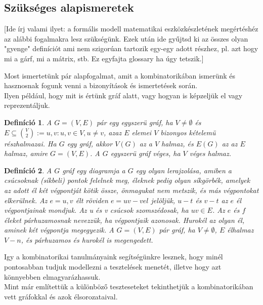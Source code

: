 \documentclass[12pt]{article}
\newtheorem{defin}{Definíció}[section]
\begin{document}
\subsection{Szükséges alapismeretek}
[Ide írj valami ilyet: a formális modell matematikai eszközkészletének megértéshéz az alábbi fogalmakra lesz szükségünk. Ezek után ide gyűjtsd ki az összes olyan "gyenge" definíciót ami nem szigorúan tartozik egy-egy adott részhez, pl. azt hogy mi a gárf, mi a mátrix, stb. Ez egyfajta glossary ha úgy tetszik.]



Most ismertetünk pár alapfogalmat, amit a kombinatorikában ismerünk és hasznosnak fogunk venni a bizonyítások és ismertetések során.\\

Ilyen például, hogy mit is értünk gráf alatt, vagy hogyan is képzeljük el vagy reprezentáljuk.

\begin{defin}
A $G = (V,E)$ pár egy egyszerü gráf, ha $V \neq \emptyset$ és $E \subseteq \binom{V}{2} := {{u,v} : u,v \in V, u \neq v}$, azaz $E$ elemei $V$ bizonyos kételemü részhalmazai. Ha $G$ egy gráf, akkor $V(G)$ az a $V$ halmaz, és $E(G)$ az az $E$ halmaz, amire $G = (V,E)$. A $G$ egyszerü gráf véges, ha $V$ véges halmaz. ~\cite{szam:Fleiner}
\end{defin}

\begin{defin}
A $G$ gráf egy diagramja a $G$ egy olyan lerajzolása, amiben a csúcsoknak (síkbeli) pontok felelnek meg, éleknek pedig olyan síkgörbék, amelyek az adott él két végpontját kötik össze, önmagukat nem metszik, és más végpontokat elkerülnek. Az $e = {u, v}$ élt röviden $e = uv-vel$ jelöljük, $u-t$ és $v-t$ az $e$ él végpontjainak mondjuk. Az u és v csúcsok szomszédosak, ha $uv \in E$. Az $e$ és $f$ éleket párhuzamosnak nevezzük, ha végpontjaik azonosak. Hurokél az olyan él, aminek két végpontja megegyezik. A $G = (V,E)$ pár gráf, ha $V \neq \emptyset$, $E$ élhalmaz $V-n$, és párhuzamos és hurokél is megengedett. ~\cite{szam:Fleiner}
\end{defin}

Igy a kombinatorikai tanulmányaink segítségünkre lesznek, hogy minél pontosabban tudjuk modellezni a tesztelések menetét, illetve hogy azt könnyebben elmagyarázhassuk.\\
Mint már említettük a különböző teszteseteket tekinthetjük a kombinatorikában vett gráfokkal és azok élsorozataival.\\
\end{document}
